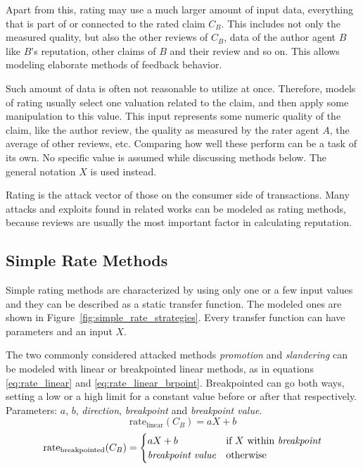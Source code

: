\documentclass[%
    ]{\PathToTumTemplate/thesis/tum_thesis}
\begin{document}
Apart from this, rating may use a much larger amount of input data, everything that is part of or connected to the rated claim $C_B$.
This includes not only the measured quality, but also the other reviews of $C_B$, data of the author agent $B$ like $B$'s reputation, other claims of $B$ and their review and so on.
This allows modeling elaborate methods of feedback behavior.

Such amount of data is often not reasonable to utilize at once.
Therefore, models of rating usually select one valuation related to the claim, and then apply some manipulation to this value.
This input represents some numeric quality of the claim, like the author review, the quality as measured by the rater agent $A$, the average of other reviews, etc.
Comparing how well these perform can be a task of its own.
No specific value is assumed while discussing methods below.
The general notation $X$ is used instead.

Rating is the attack vector of those on the consumer side of transactions.
Many attacks and exploits found in related works can be modeled as rating methods, because reviews are usually the most important factor in calculating reputation.


\subsection{Simple Rate Methods}

Simple rating methods are characterized by using only one or a few input values and they can be described as a static transfer function.
The modeled ones are shown in Figure~\ref{fig:simple_rate_strategies}.
Every transfer function can have parameters and an input $X$.

The two commonly considered attacked methods \emph{promotion} and \emph{slandering} can be modeled with linear or breakpointed linear methods, as in equations \ref{eq:rate_linear} and \ref{eq:rate_linear_brpoint}. Breakpointed can go both ways, setting a low or a high limit for a constant value before or after that respectively. Parameters: $a$, $b$, \emph{direction}, \emph{breakpoint} and \emph{breakpoint value}.
\begin{equation}\label{eq:rate_linear}
\mathrm{rate_{linear}}(C_B) = aX+b
\end{equation}
\begin{equation}\label{eq:rate_linear_brpoint}
\mathrm{rate_{breakpointed}}(C_B) = 
    \begin{cases}
      aX+b & \text{if $X$ within \emph{breakpoint}} \\
      \text{\emph{breakpoint value}} & \text{otherwise}\\
    \end{cases}
\end{equation}
\end{document}
